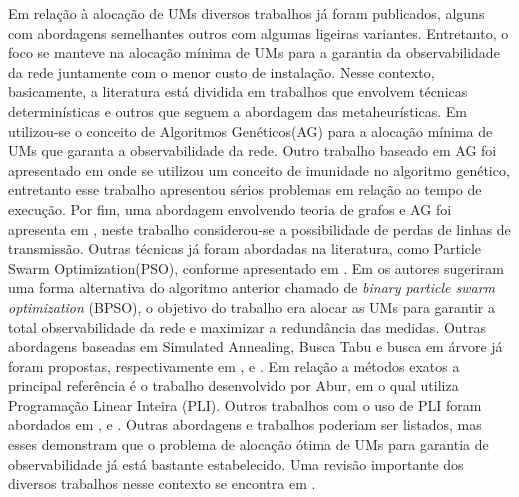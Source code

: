\documentclass[12pt]{article}
\begin{document}
Em relação à alocação de UMs diversos trabalhos já foram publicados, alguns com abordagens semelhantes outros com algumas ligeiras variantes. Entretanto, o foco se manteve na alocação mínima de UMs para a garantia da observabilidade da rede juntamente com o menor custo de instalação. Nesse contexto, basicamente, a literatura está dividida em trabalhos que envolvem técnicas determinísticas e outros que seguem a abordagem das metaheurísticas. Em \cite{Marin03} utilizou-se o conceito de Algoritmos Genéticos(AG) para a alocação mínima de UMs que garanta a observabilidade da rede. Outro trabalho baseado em AG foi apresentado em \cite{Aminifar09} onde se utilizou um conceito de imunidade no algoritmo genético, entretanto esse trabalho apresentou sérios problemas em relação ao tempo de execução. Por fim, uma abordagem  envolvendo teoria de grafos e AG foi apresenta em \cite{Milosev03}, neste trabalho considerou-se a possibilidade de perdas de linhas de transmissão. Outras técnicas já foram abordadas na literatura, como Particle Swarm Optimization(PSO), conforme apresentado em \cite{PSO}. Em \cite{BPSO} os autores sugeriram uma forma alternativa do algoritmo anterior chamado de \textit{binary particle swarm optimization} (BPSO), o objetivo do trabalho era alocar as UMs para garantir a total observabilidade da rede e maximizar a redundância das medidas. Outras abordagens baseadas em Simulated Annealing,  Busca Tabu e busca em árvore já foram propostas, respectivamente em \cite{SA}, \cite{TS} e \cite{Tree}. Em relação a métodos exatos a principal referência é o trabalho desenvolvido por Abur, em \cite{Abur04_opt} o qual utiliza Programação Linear Inteira (PLI). Outros trabalhos com o uso de PLI foram abordados em \cite{Amin10},\cite{Gou08_1} e \cite{Gou08_2}. Outras abordagens e trabalhos poderiam ser listados, mas esses demonstram que o problema de alocação ótima de UMs para garantia de observabilidade já está bastante estabelecido. Uma revisão importante dos diversos trabalhos nesse contexto se encontra em \cite{ReviewAlloc}.
\end{document}
